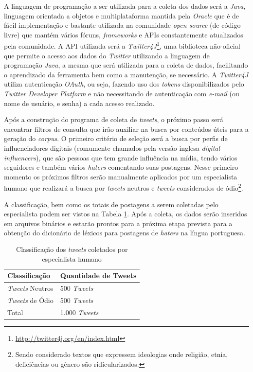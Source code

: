A linguagem de programação a ser utilizada para a coleta dos dados será a \textit{Java}, linguagem orientada a objetos e multiplataforma mantida pela \textit{Oracle} que é de fácil implementação e bastante utilizada na comunidade \textit{open source} (de código livre) que mantém vários fóruns, \textit{frameworks} e APIs constantemente atualizados pela comunidade. A API utilizada será a \textit{Twitter4J}\footnote{\url{http://twitter4j.org/en/index.html}}, uma biblioteca não-oficial que permite o acesso aos dados do \textit{Twitter} utilizando a linguagem de programação \textit{Java}, a mesma que será utilizada para a coleta de dados, facilitando o aprendizado da ferramenta bem como a manutenção, se necessário. A \textit{Twitter4J} utiliza autenticação \textit{OAuth}, ou seja, fazendo uso dos \textit{tokens} disponibilizados pelo \textit{Twitter Developer Platform} e não necessitando de autenticação com \textit{e-mail} (ou nome de usuário, e senha) a cada acesso realizado. 

Após a construção do programa de coleta de \textit{tweets}, o próximo passo será encontrar filtros de consulta que irão auxiliar na busca por conteúdos úteis para a geração do \textit{corpus}. O primeiro critério de seleção será a busca por perfis de influenciadores digitais (comumente chamados pela versão inglesa \textit{digital influencers}), que são pessoas que tem grande influência na mídia, tendo vários seguidores e também vários \textit{haters} comentando suas postagens. Nesse primeiro momento os próximos filtros serão manualmente aplicados por um especialista humano que realizará a busca por \textit{tweets} neutros e \textit{tweets} considerados de ódio\footnote{Sendo considerado textos que expressem ideologias onde religião, etnia, deficiências ou gênero são ridicularizados.}. 

A classificação, bem como os totais de postagens a serem coletadas pelo especialista podem ser vistos na Tabela \ref{tab:classificacaotweets}.
Após a coleta, os dados serão inseridos em arquivos binários e estarão prontos para a próxima etapa prevista para a obtenção do dicionário de léxicos para postagens de \textit{haters} na língua portuguesa.
\begin{table}[h!]
  \begin{center}
    \caption{Classificação dos \textit{tweets} coletados por especialista humano}
    \label{tab:classificacaotweets}
    \begin{tabular}{ll} %
    \textbf{Classificação} & \textbf{Quantidade de Tweets}\\
    \hline
    \textit{Tweets} Neutros&500 \textit{Tweets}&\\
    \textit{Tweets} de Ódio&500 \textit{Tweets}&\\
    \hline
    Total&1.000 \textit{Tweets}\\
    \end{tabular}
  \end{center}
\end{table}

